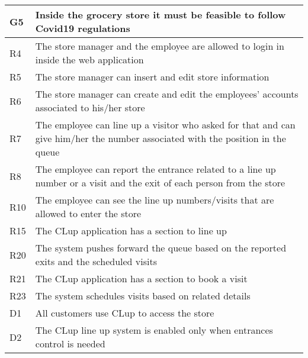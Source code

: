 \begin{center}
        {\renewcommand{\arraystretch}{1.5}
        \begin{longtable}{L{2cm}L{12cm}}
            \hline
            \textbf{G5} & \textbf{Inside the grocery store it must be feasible to follow Covid19 regulations} \\
            \hline
             R4 & The store manager and the employee are allowed to login in inside the web application \\
            \hline
             R5 & The store manager can insert and edit store information \\
            \hline
             R6 & The store manager can create and edit the employees’ accounts associated to his/her store \\
            \hline
             R7 & The employee can line up a visitor who asked for that and can give him/her the number associated with the position in the queue \\
            \hline
             R8 & The employee can report the entrance related to a line up number or a visit and the exit of each person from the store \\
            \hline
             R10 & The employee can see the line up numbers/visits that are allowed to enter the store \\
            \hline
             R15 & The CLup application has a section to line up \\
            \hline
             R20 & The system pushes forward the queue based on the reported exits and the scheduled visits \\
            \hline
             R21 & The CLup application has a section to book a visit \\
            \hline
             R23 & The system schedules visits based on related details \\
            \hline
             D1 & All customers use CLup to access the store \\
            \hline
             D2 & The CLup line up system is enabled only when entrances control is needed \\
            \hline

\end{longtable}}
\end{center}
